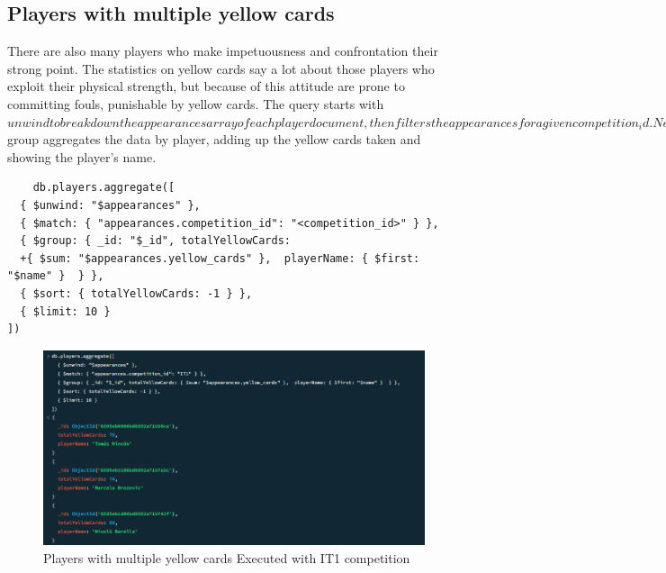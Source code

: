 \documentclass{Configuration_Files/PoliMi3i_thesis}
\begin{document}
\subsection{Players with multiple yellow cards}
There are also many players who make impetuousness and confrontation their strong point. The statistics on yellow cards say a lot about those players who exploit their physical strength, but because of this attitude are prone to committing fouls, punishable by yellow cards. The query starts with $unwind to break down the appearances array of each player document, then filters the appearances for a given competition_id. Next, $group aggregates the data by player, adding up the yellow cards taken and showing the player's name. 
\begin{verbatim}
    db.players.aggregate([
  { $unwind: "$appearances" },
  { $match: { "appearances.competition_id": "<competition_id>" } },
  { $group: { _id: "$_id", totalYellowCards: 
  +{ $sum: "$appearances.yellow_cards" },  playerName: { $first: "$name" }  } },
  { $sort: { totalYellowCards: -1 } },
  { $limit: 10 }
])

\end{verbatim}

\begin{figure}[htbp]
    \centering
    \includegraphics[scale=0.9]{Images/Queries/Competitions_statistics/yellow-cards/IT1.png}
    \caption{Players with multiple yellow cards Executed with IT1 competition}
\end{figure}
\newpage
\end{document}
